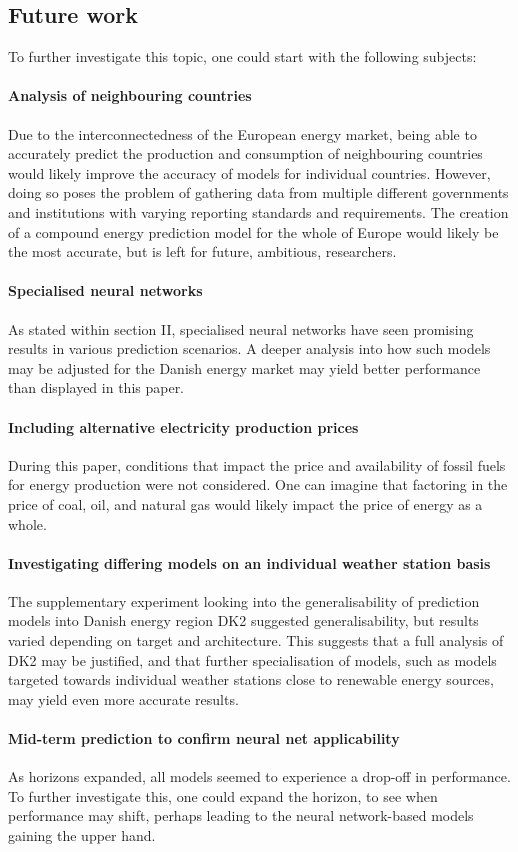 \subsection{Future work}\label{sec:futurework}
To further investigate this topic, one could start with the
following subjects:
\paragraph{Analysis of neighbouring countries} Due to the
interconnectedness of the European energy market, being able
to accurately predict the production and consumption of neighbouring countries 
would likely improve the accuracy of models
for individual countries. However, doing so poses the problem
of gathering data from multiple different governments and
institutions with varying reporting standards and requirements.
The creation of a compound energy prediction model for the
whole of Europe would likely be the most accurate, but is left
for future, ambitious, researchers.
\paragraph{Specialised neural networks} As stated within section II, 
specialised neural networks have seen promising results
in various prediction scenarios. A deeper analysis into how
such models may be adjusted for the Danish energy market
may yield better performance than displayed in this paper.
\paragraph{Including alternative electricity production prices}
During this paper, conditions that impact the price and
availability of fossil fuels for energy production were not
considered. One can imagine that factoring in the price of
coal, oil, and natural gas would likely impact the price of
energy as a whole.
\paragraph{Investigating differing models on an individual weather
station basis} The supplementary experiment looking into the
generalisability of prediction models into Danish energy region
DK2 suggested generalisability, but results varied depending
on target and architecture. This suggests that a full analysis
of DK2 may be justified, and that further specialisation of
models, such as models targeted towards individual weather
stations close to renewable energy sources, may yield even
more accurate results.
\paragraph{Mid-term prediction to confirm neural net applicability}
As horizons expanded, all models seemed to experience a
drop-off in performance. To further investigate this, one could
expand the horizon, to see when performance may shift, perhaps
leading to the neural network-based models gaining the upper
hand.